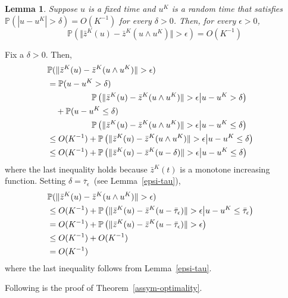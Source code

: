 \documentclass[10pt,journal,letterpaper]{IEEEtran}
\newtheorem{lemma}{Lemma}[section]
\begin{document}
\begin{lemma}
\label{epsi-delta} Suppose $u$ is a fixed time and $u^K$ is a random
time that satisfies $\mathbb{P}\left(|u- u^K| > \delta\right) =
O(K^{-1})$ for every $\delta
> 0$. Then, for every $\epsilon > 0$,
\[
\mathbb{P}\left(\Vert \bar{z}^K(u)- \bar{z}^K(u \wedge u^K) \Vert
> \epsilon\right) = O(K^{-1})
\]
\end{lemma}
\begin{IEEEproof}
Fix a $\delta > 0$. Then,
\begin{align*}
\lefteqn{\mathbb{P}(\Vert \bar{z}^K(u)- \bar{z}^K(u \wedge u^K)
\Vert
> \epsilon)}\\
&=\mathbb{P}(u-u^K > \delta) \\
& \ \ \ \ \ \ \ \ \ \ \ \ \ \ \ \ \mathbb{P}\left(\Vert
\bar{z}^K(u)-
\bar{z}^K(u \wedge u^K) \Vert > \epsilon \big| u-u^K > \delta\right)\\
&~ \ \ +\mathbb{P}(u-u^K \leq \delta) \\
 & \ \ \ \ \ \ \ \ \ \ \ \ \ \ \ \ \mathbb{P}\left(\Vert \bar{z}^K(u)-
\bar{z}^K(u \wedge u^K) \Vert > \epsilon \big| u-u^K \leq \delta\right)\\
&\leq O(K^{-1})+ \mathbb{P}\left(\Vert \bar{z}^K(u)-\bar{z}^K(u
\wedge u^K) \Vert > \epsilon \big| u-u^K \leq \delta\right) \\
&\leq O(K^{-1})+ \mathbb{P}\left(\Vert \bar{z}^K(u)- \bar{z}^K(u -
\delta) \Vert > \epsilon \big| u-u^K \leq \delta\right)
\end{align*}
where the last inequality holds because $\bar{z}^K(t)$ is a monotone
increasing function. Setting $\delta = \bar{\tau}_{\epsilon}$~(see
Lemma~\ref{epsi-tau}),
\begin{align*}
\lefteqn{\mathbb{P}(\Vert \bar{z}^K(u)- \bar{z}^K(u \wedge u^K)
\Vert
> \epsilon)}\\
&\leq O(K^{-1})+ \mathbb{P}\left(\Vert \bar{z}^K(u)-
\bar{z}^K(u - \bar{\tau}_{\epsilon}) \Vert > \epsilon \big| u-u^K \leq \bar{\tau}_{\epsilon}\right)\\
&= O(K^{-1})+ \mathbb{P}\left(\Vert \bar{z}^K(u)-
\bar{z}^K(u - \bar{\tau}_{\epsilon}) \Vert > \epsilon \right)\\
&\leq O(K^{-1}) + O(K^{-1}) \\
&= O(K^{-1})
\end{align*}
where the last inequality follows from Lemma~\ref{epsi-tau}.
\end{IEEEproof}

Following is the proof of Theorem~\ref{assym-optimality}.
\end{document}

